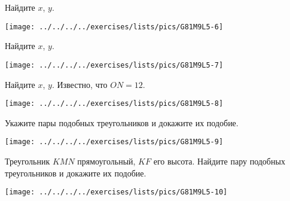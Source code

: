 \begin{class}[number=5]
\begin{listofex}
		\begin{minipage}[t]{\bodywidth}
			Найдите \( x \), \( y \).
		\end{minipage}
		\hspace{0.02\linewidth}
		\begin{minipage}[t]{\picwidth}
			\texttt{[image: ../../../../exercises/lists/pics/G81M9L5-6]}
		\end{minipage}
		\item
		\begin{minipage}[t]{\bodywidth}
			Найдите \( x \), \( y \).
		\end{minipage}
		\hspace{0.02\linewidth}
		\begin{minipage}[t]{\picwidth}
			\texttt{[image: ../../../../exercises/lists/pics/G81M9L5-7]}
		\end{minipage}
		\item
		\begin{minipage}[t]{\bodywidth}
			Найдите \( x \), \( y \). Известно, что \( ON=12 \).
		\end{minipage}
		\hspace{0.02\linewidth}
		\begin{minipage}[t]{\picwidth}
			\texttt{[image: ../../../../exercises/lists/pics/G81M9L5-8]}
		\end{minipage}
		\item 
		\begin{minipage}[t]{\bodywidth}
			Укажите пары подобных треугольников и докажите их подобие.
		\end{minipage}
		\hspace{0.02\linewidth}
		\begin{minipage}[t]{\picwidth}
			\texttt{[image: ../../../../exercises/lists/pics/G81M9L5-9]}
		\end{minipage}
		\item 
		\begin{minipage}[t]{\bodywidth}
			Треугольник \( KMN \) прямоугольный, \( KF \) его высота. Найдите пару подобных треугольников и докажите их подобие.
		\end{minipage}
		\hspace{0.02\linewidth}
		\begin{minipage}[t]{\picwidth}
			\texttt{[image: ../../../../exercises/lists/pics/G81M9L5-10]}
			

\end{minipage}
\end{listofex}
\end{class}
